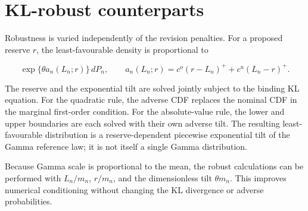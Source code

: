 \documentclass[
  10pt,
]{article}
\begin{document}
\hypertarget{kl-robust-counterparts}{%
\section{KL-robust counterparts}\label{kl-robust-counterparts}}

Robustness is varied independently of the revision penalties. For a
proposed reserve \(r\), the least-favourable density is proportional to

\[
\exp\{\theta a_n(L_n;r)\}\,dP_n,
\qquad
a_n(L_n;r)=c^o(r-L_n)^+ + c^u(L_n-r)^+.
\]

The reserve and the exponential tilt are solved jointly subject to the
binding KL equation. For the quadratic rule, the adverse CDF replaces
the nominal CDF in the marginal first-order condition. For the
absolute-value rule, the lower and upper boundaries are each solved with
their own adverse tilt. The resulting least-favourable distribution is a
reserve-dependent piecewise exponential tilt of the Gamma reference law;
it is not itself a single Gamma distribution.

Because Gamma scale is proportional to the mean, the robust calculations
can be performed with \(L_n/m_n\), \(r/m_n\), and the dimensionless tilt
\(\theta m_n\). This improves numerical conditioning without changing
the KL divergence or adverse probabilities.
\end{document}
